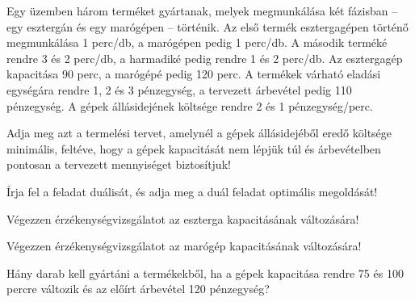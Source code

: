 \feladatszam Egy üzemben három terméket gyártanak, melyek megmunkálása két fázisban -- egy esztergán és egy marógépen -- történik. Az első termék esztergagépen történő megmunkálása 1 perc/db, a marógépen pedig 1 perc/db. A második terméké rendre 3 és 2 perc/db, a harmadiké pedig rendre 1 és 2 perc/db. Az esztergagép kapacitása 90 perc, a marógépé pedig 120 perc. A termékek várható eladási egységára rendre 1, 2 és 3 pénzegység, a tervezett árbevétel pedig 110 pénzegység. A gépek állásidejének költsége rendre 2 és 1 pénzegység/perc.

\begin{alphanumericlist}
\item Adja meg azt a termelési tervet, amelynél a gépek állásidejéből eredő költsége minimális, feltéve, hogy a gépek kapacitását nem lépjük túl és árbevételben pontosan a tervezett mennyiséget biztosítjuk!
\item Írja fel a feladat duálisát, és adja meg a duál feladat optimális megoldását!
\item Végezzen érzékenységvizsgálatot az eszterga kapacitásának változására!
\item Végezzen érzékenységvizsgálatot az marógép kapacitásának változására!
\item Hány darab kell gyártáni a termékekből, ha a gépek kapacitása rendre 75 és 100 percre változik és az előírt árbevétel 120 pénzegység?
\end{alphanumericlist}


